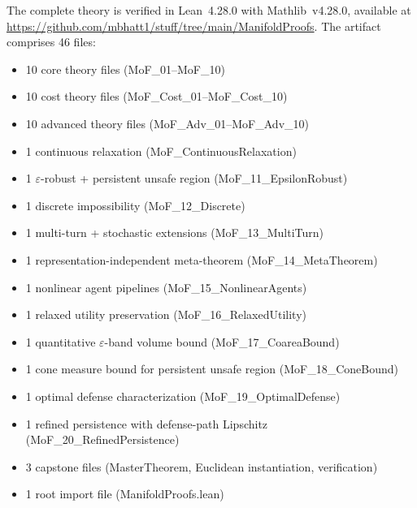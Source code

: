 \documentclass{article}
\begin{document}
The complete theory is verified in Lean~4.28.0 with Mathlib~v4.28.0,
available at
\url{https://github.com/mbhatt1/stuff/tree/main/ManifoldProofs}.
The artifact comprises 46 files:
\begin{itemize}[nosep]
  \item 10 core theory files (MoF\_01--MoF\_10)
  \item 10 cost theory files (MoF\_Cost\_01--MoF\_Cost\_10)
  \item 10 advanced theory files (MoF\_Adv\_01--MoF\_Adv\_10)
  \item 1 continuous relaxation (MoF\_ContinuousRelaxation)
  \item 1 $\varepsilon$-robust + persistent unsafe region
    (MoF\_11\_EpsilonRobust)
  \item 1 discrete impossibility (MoF\_12\_Discrete)
  \item 1 multi-turn + stochastic extensions
    (MoF\_13\_MultiTurn)
  \item 1 representation-independent meta-theorem
    (MoF\_14\_MetaTheorem)
  \item 1 nonlinear agent pipelines (MoF\_15\_NonlinearAgents)
  \item 1 relaxed utility preservation (MoF\_16\_RelaxedUtility)
  \item 1 quantitative $\varepsilon$-band volume bound
    (MoF\_17\_CoareaBound)
  \item 1 cone measure bound for persistent unsafe region
    (MoF\_18\_ConeBound)
  \item 1 optimal defense characterization
    (MoF\_19\_OptimalDefense)
  \item 1 refined persistence with defense-path Lipschitz
    (MoF\_20\_RefinedPersistence)
  \item 3 capstone files (MasterTheorem, Euclidean instantiation,
    verification)
  \item 1 root import file (ManifoldProofs.lean)
\end{itemize}
\end{document}
